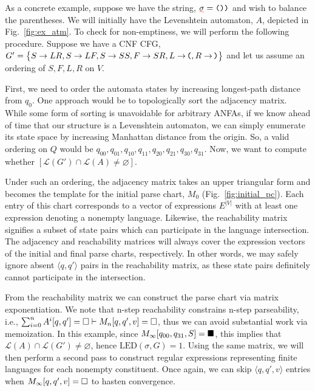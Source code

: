 \documentclass[sigplan,review,acmsmall,nonacm,screen,anonymous]{acmart}\settopmatter{printfolios=false,printccs=false,printacmref=false}
\begin{document}
As a concrete example, suppose we have the string, $\err\sigma=\texttt{())}$ and wish to balance the parentheses. We will initially have the Levenshtein automaton, $A$, depicted in Fig.~\ref{fig:ex_atm}. To check for non-emptiness, we will perform the following procedure. Suppose we have a CNF CFG, $G'= \big\{S \rightarrow L R, S \rightarrow L F, S \rightarrow S S, F \rightarrow S R, L \rightarrow \hspace{-0.05cm}\texttt{(}, R \rightarrow\hspace{-0.05cm}\texttt{)}\big\}$ and let us assume an ordering of $S, F, L, R$ on $V$.

First, we need to order the automata states by increasing longest-path distance from $q_0$. One approach would be to topologically sort the adjacency matrix. While some form of sorting is unavoidable for arbitrary ANFAs, if we know ahead of time that our structure is a Levenshtein automaton, we can simply enumerate its state space by increasing Manhattan distance from the origin. %
So, a valid ordering on $Q$ would be $q_{00}, q_{01}, q_{10}, q_{11}, q_{20}, q_{21}, q_{30}, q_{31}$. Now, we want to compute whether $[\mathcal{L}(G')\cap \mathcal{L}(A) \neq \varnothing]$.

Under such an ordering, the adjacency matrix takes an upper triangular form and becomes the template for the initial parse chart, $M_0$ (Fig.~\ref{fig:initial_pc}). Each entry of this chart corresponds to a vector of expressions $E^{|V|}$ with at least one expression denoting a nonempty language. Likewise, the reachability matrix signifies a subset of state pairs which can participate in the language intersection. The adjacency and reachability matrices will always cover the expression vectors of the initial and final parse charts, respectively. In other words, we may safely ignore absent $\langle q, q'\rangle$ pairs in the reachability matrix, as these state pairs definitely cannot participate in the intersection.

From the reachability matrix we can construct the parse chart via matrix exponentiation. We note that n-step reachability constrains n-step parseability, i.e., $\sum_{i=0}^n A^i[q, q'] = \square \vdash M_n[q, q', v] = \square$, thus we can avoid substantial work via memoization. In this example, since $M_\infty[q_{00}, q_{31}, S] = \blacksquare$, this implies that $\mathcal{L}(A)\cap \mathcal{L}(G') \neq \varnothing$, hence $\text{LED}(\sigma, G) = 1$. Using the same matrix, we will then perform a second pass to construct regular expressions representing finite languages for each nonempty constituent. Once again, we can skip $\langle q, q', v\rangle$ entries when $M_\infty[q, q', v] = \square$ to hasten convergence.
\end{document}
